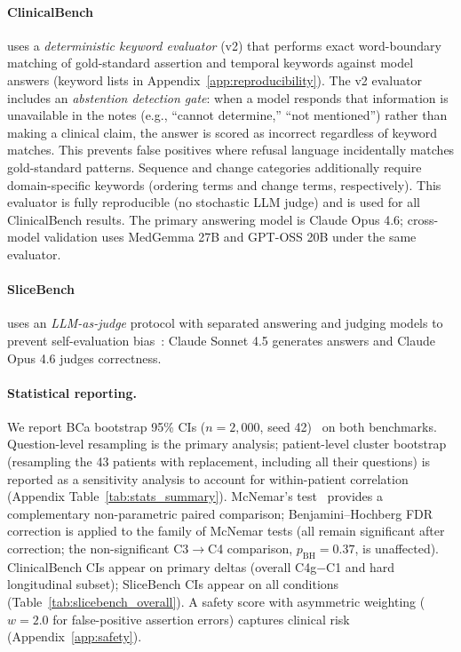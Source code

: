 \paragraph{ClinicalBench} uses a \emph{deterministic keyword evaluator} (v2) that performs exact word-boundary matching of gold-standard assertion and temporal keywords against model answers (keyword lists in Appendix~\ref{app:reproducibility}).
The v2 evaluator includes an \emph{abstention detection gate}: when a model responds that information is unavailable in the notes (e.g., ``cannot determine,'' ``not mentioned'') rather than making a clinical claim, the answer is scored as incorrect regardless of keyword matches.
This prevents false positives where refusal language incidentally matches gold-standard patterns.
Sequence and change categories additionally require domain-specific keywords (ordering terms and change terms, respectively).
This evaluator is fully reproducible (no stochastic LLM judge) and is used for all ClinicalBench results.
The primary answering model is Claude Opus 4.6; cross-model validation uses MedGemma 27B and GPT-OSS 20B under the same evaluator.

\paragraph{SliceBench} uses an \emph{LLM-as-judge} protocol with separated answering and judging models to prevent self-evaluation bias~\cite{xiong2024mirage}: Claude Sonnet 4.5 generates answers and Claude Opus 4.6 judges correctness.

\paragraph{Statistical reporting.}
We report BCa bootstrap 95\% CIs ($n=2{,}000$, seed 42)~\cite{efron1993bootstrap} on both benchmarks.
Question-level resampling is the primary analysis; patient-level cluster bootstrap (resampling the 43 patients with replacement, including all their questions) is reported as a sensitivity analysis to account for within-patient correlation (Appendix Table~\ref{tab:stats_summary}).
McNemar's test~\cite{mcnemar1947note} provides a complementary non-parametric paired comparison; Benjamini--Hochberg FDR correction is applied to the family of McNemar tests (all remain significant after correction; the non-significant C3$\to$C4 comparison, $p_{\text{BH}} = 0.37$, is unaffected).
ClinicalBench CIs appear on primary deltas (overall C4g$-$C1 and hard longitudinal subset); SliceBench CIs appear on all conditions (Table~\ref{tab:slicebench_overall}).
A safety score with asymmetric weighting ($w=2.0$ for false-positive assertion errors) captures clinical risk (Appendix~\ref{app:safety}).

